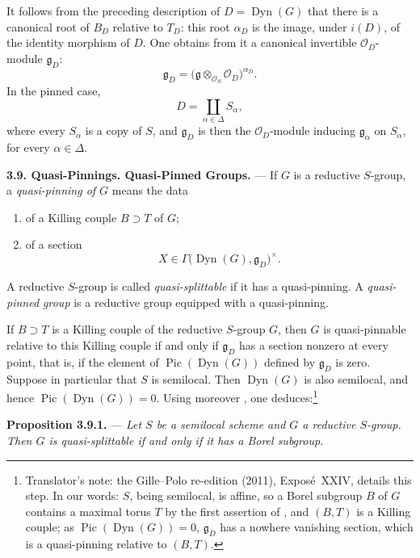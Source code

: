 It follows from the preceding description of
\(D=\operatorname{Dyn}(G)\) that there is a canonical root of \(B_D\)
relative to \(T_D\): this root \(\alpha_D\) is the image, under
\(i(D)\), of the identity morphism of \(D\). One obtains from it a
canonical invertible \(\mathcal O_D\)-module \(\mathfrak g_D\):
\[
  \mathfrak g_D
  =
  \bigl(\mathfrak g\otimes_{\mathcal O_S}\mathcal O_D\bigr)^{\alpha_D}.
\]
In the pinned case,
\[
  D=\coprod_{\alpha\in\Delta}S_\alpha,
\]
where every \(S_\alpha\) is a copy of \(S\), and
\(\mathfrak g_D\) is then the \(\mathcal O_D\)-module inducing
\(\mathfrak g_\alpha\) on \(S_\alpha\), for every
\(\alpha\in\Delta\).

\medskip\noindent\textbf{3.9. Quasi-Pinnings. Quasi-Pinned Groups.} ---
If \(G\) is a reductive \(S\)-group, a \emph{quasi-pinning of \(G\)}
means the data
\begin{enumerate}
\item[(i)] of a Killing couple \(B\supset T\) of \(G\);
\item[(ii)] of a section
\[
  X\in\Gamma\bigl(\operatorname{Dyn}(G),\mathfrak g_D\bigr)^\times.
\]
\end{enumerate}
A reductive \(S\)-group is called \emph{quasi-splittable} if it has a
quasi-pinning. A \emph{quasi-pinned group} is a reductive group
equipped with a quasi-pinning.

If \(B\supset T\) is a Killing couple of the reductive \(S\)-group
\(G\), then \(G\) is quasi-pinnable relative to this Killing couple
if and only if \(\mathfrak g_D\) has a section nonzero at every point,
that is, if the element of \(\operatorname{Pic}(\operatorname{Dyn}(G))\)
defined by \(\mathfrak g_D\) is zero. Suppose in particular that
\(S\) is semilocal. Then \(\operatorname{Dyn}(G)\) is also semilocal,
and hence \(\operatorname{Pic}(\operatorname{Dyn}(G))=0\). Using moreover
, one deduces:\footnote{Translator's note: the Gille--Polo re-edition (2011), Exposé~XXIV,
details this step. In our words: \(S\), being semilocal, is affine, so a Borel subgroup \(B\) of
\(G\) contains a maximal torus \(T\) by the first assertion of
, and \((B,T)\) is a Killing couple; as
\(\operatorname{Pic}(\operatorname{Dyn}(G))=0\), \(\mathfrak g_D\) has a nowhere vanishing section,
which is a quasi-pinning relative to \((B,T)\).}

\medskip\noindent\textbf{Proposition 3.9.1.} ---
{\itshape Let \(S\) be a semilocal scheme and \(G\) a reductive
\(S\)-group. Then \(G\) is quasi-splittable if and only if it has a
Borel subgroup.}

